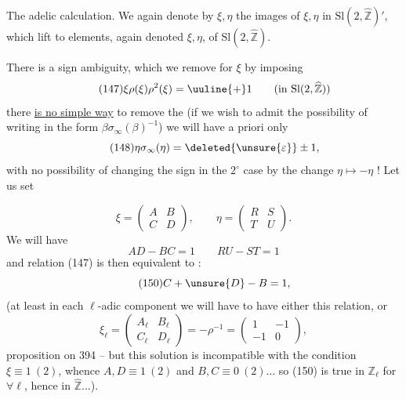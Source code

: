 
The adelic calculation. We again denote by $\xi,\eta$ the images of $\xi,\eta$ in $\mathrm{Sl}(2,\widehat{\mathbb Z})'$, which lift to elements, again denoted $\xi,\eta$, of $\mathrm{Sl}(2,\widehat{\mathbb Z})$.

There is a sign ambiguity, which we remove for $\xi$ by imposing
\[
\tag{147}
\xi\rho(\xi)\rho^2(\xi)=\uuline{+}1
\qquad(\text{in }\mathrm{Sl}(2,\widehat{\mathbb Z}))
\]
 there \uline{is no simple way} to remove the  (if we wish to admit  the possibility of writing in the form $\beta\sigma_\infty(\beta)^{-1}$) \uline{} we will have a priori only
\[
\tag{148}
\eta\sigma_\infty(\eta)=\deleted{\unsure{\varepsilon}}\pm1,
\]
with no possibility of changing the sign in the $2^\circ$ case by the change $\eta\mapsto-\eta$ ! Let us set


\[
\tag{148}
\xi=\begin{pmatrix}A&B\\C&D\end{pmatrix},\qquad
\eta=\begin{pmatrix}R&S\\T&U\end{pmatrix}.
\]
We will have
\[
\tag{149}
AD-BC=1\qquad RU-ST=1
\]
and relation (147) is then equivalent to :
\[
\tag{150}
C+\unsure{D}-B=1,
\]
 (at least in each $\ell$-adic component we will have to have either this relation, or
\[
\xi_\ell=\begin{pmatrix}A_\ell&B_\ell\\C_\ell&D_\ell\end{pmatrix}
=-\rho^{-1}=\begin{pmatrix}1&-1\\-1&0\end{pmatrix},
\]
 proposition on  394 -- but this solution is incompatible with the condition $\boxed{\xi\equiv1\ (2)}$, whence $A,D\equiv1\ (2)$ and $B,C\equiv0\ (2)\ldots$ so (150) is true in $\mathbb Z_\ell$ for $\forall\ell$, hence in $\widehat{\mathbb Z}\ldots$).


